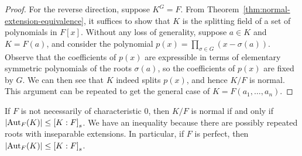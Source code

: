 \begin{proof}
    \medskip

    For the reverse direction, suppose \(K^G = F\).
    From Theorem~\ref{thm:normal-extension-equivalence},
    it suffices to show that \(K\) is the splitting field of a set of polynomials in \(F[x]\).
    Without any loss of generality, suppose \(a \in K\) and \(K = F(a)\),
    and consider the polynomial \(p(x) = \prod_{\sigma \in G} (x - \sigma(a))\).
    Observe that the coefficients of \(p(x)\)
    are expressible in terms of elementary symmetric polynomials of the roots \(\sigma(a)\),
    so the coefficients of \(p(x)\) are fixed by \(G\).
    We can then see that \(K\) indeed splits \(p(x)\), and hence \(K/F\) is normal.
    This argument can be repeated to get the general case of \(K = F(a_1,\hdots,a_n)\).
\end{proof}
\begin{remark}
    If \(F\) is not necessarily of characteristic 0,
    then \(K/F\) is normal if and only if \(\abs{\operatorname{Aut}_F(K)} \leq {[K:F]}_s\).
    We have an inequality because there are possibly repeated roots with inseparable extensions.
    In particular, if \(F\) is perfect, then \(\abs{\operatorname{Aut}_F(K)} \leq {[K:F]}_s\).
\end{remark}

